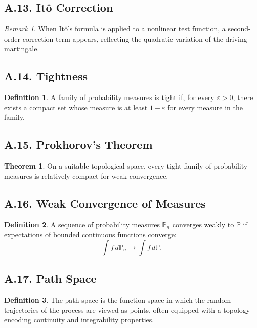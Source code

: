 \documentclass[11pt]{article}
\theoremstyle{definition}
\newtheorem{definition}{Definition}
\newtheorem{theorem}{Theorem}
\theoremstyle{remark}
\newtheorem{remark}{Remark}
\begin{document}
\subsection*{A.13. It\^o Correction}
\begin{remark}
When It\^o's formula is applied to a nonlinear test function, a second-order correction term appears, reflecting the quadratic variation of the driving martingale.
\end{remark}

\subsection*{A.14. Tightness}
\begin{definition}
A family of probability measures is tight if, for every \(\varepsilon>0\), there exists a compact set whose measure is at least \(1-\varepsilon\) for every measure in the family.
\end{definition}

\subsection*{A.15. Prokhorov's Theorem}
\begin{theorem}
On a suitable topological space, every tight family of probability measures is relatively compact for weak convergence.
\end{theorem}

\subsection*{A.16. Weak Convergence of Measures}
\begin{definition}
A sequence of probability measures \(\mathbb P_n\) converges weakly to \(\mathbb P\) if expectations of bounded continuous functions converge:
\[
\int f\,d\mathbb P_n \to \int f\,d\mathbb P.
\]
\end{definition}

\subsection*{A.17. Path Space}
\begin{definition}
The path space is the function space in which the random trajectories of the process are viewed as points, often equipped with a topology encoding continuity and integrability properties.
\end{definition}
\end{document}
